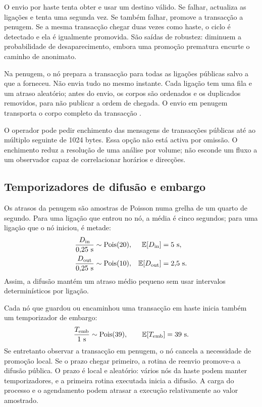 O envio por haste tenta obter e usar um destino válido. Se falhar, actualiza as
ligações e tenta uma segunda vez. Se também falhar, promove a transacção a
penugem. Se a mesma transacção chegar duas vezes como haste, o ciclo é
detectado e ela é igualmente promovida. São saídas de robustez: diminuem a
probabilidade de desaparecimento, embora uma promoção prematura encurte o
caminho de anonimato.

Na penugem, o nó prepara a transacção para todas as ligações públicas salvo a
que a forneceu. Não envia tudo no mesmo instante. Cada ligação tem uma fila e
um atraso aleatório; antes do envio, os corpos são ordenados e os duplicados
removidos, para não publicar a ordem de chegada. O envio em penugem transporta
o corpo completo da transacção \cite{monero-source-v16}.

O operador pode pedir enchimento das mensagens de transacções públicas até ao
múltiplo seguinte de 1024 bytes. Essa opção não está activa por omissão. O
enchimento reduz a resolução de uma análise por volume; não esconde um fluxo a
um observador capaz de correlacionar horários e direcções.


\subsection{Temporizadores de difusão e embargo}
\label{subsec:dandelion-timers}

Os atrasos da penugem são amostras de Poisson numa grelha de um quarto de
segundo. Para uma ligação que entrou no nó, a média é cinco segundos; para uma
ligação que o nó iniciou, é metade:
\begin{align}
 \frac{D_{\rm in}}{0{,}25\ {\rm s}}&\sim\operatorname{Pois}(20),&
 \mathbb E[D_{\rm in}]&=5\ {\rm s},
 \label{eq:dandelion-diffusion-in}\\
 \frac{D_{\rm out}}{0{,}25\ {\rm s}}&\sim\operatorname{Pois}(10),&
 \mathbb E[D_{\rm out}]&=2{,}5\ {\rm s}.
 \label{eq:dandelion-diffusion-out}
\end{align}
Assim, a difusão mantém um atraso médio pequeno sem usar intervalos
determinísticos por ligação.

Cada nó que guardou ou encaminhou uma transacção em haste inicia também um
temporizador de embargo:
\begin{align}
 \frac{T_{\rm emb}}{1\ {\rm s}}\sim\operatorname{Pois}(39),
 \qquad \mathbb E[T_{\rm emb}]=39\ {\rm s}.
 \label{eq:dandelion-embargo}
\end{align}
Se entretanto observar a transacção em penugem, o nó cancela a necessidade de
promoção local. Se o prazo chegar primeiro, a rotina de reenvio promove-a a
difusão pública. O prazo é local e aleatório: vários nós da haste podem manter
temporizadores, e a primeira rotina executada inicia a difusão. A carga do
processo e o agendamento podem atrasar a execução relativamente ao valor
amostrado.


